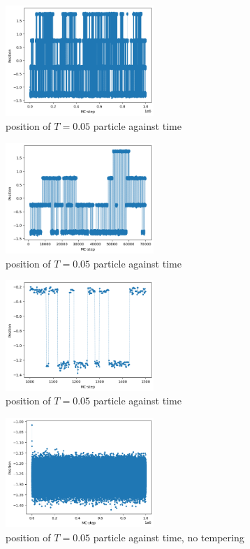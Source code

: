 \documentclass[11pt]{article}
\begin{document}
\begin{figure}[p]
	\centering
	\includegraphics[width = 0.5\textwidth]{steps_all.png}
	\caption{position of $T = 0.05$ particle against time}
	\label{fig:all}
\end{figure}
\begin{figure}[p]
	\centering
	\includegraphics[width = 0.5\textwidth]{steps_many.png}
	\caption{position of $T = 0.05$ particle against time}
	\label{fig:many}
\end{figure}
\begin{figure}[p]
	\centering
	\includegraphics[width = 0.5\textwidth]{steps_few.png}
	\caption{position of $T = 0.05$ particle against time}
	\label{fig:few}
\end{figure}
\begin{figure}
	\centering
	\includegraphics[width = 0.5\textwidth]{steps_no.png}
	\caption{position of $T = 0.05$ particle against time, no tempering}
	\label{fig:no}
\end{figure}
\end{document}
